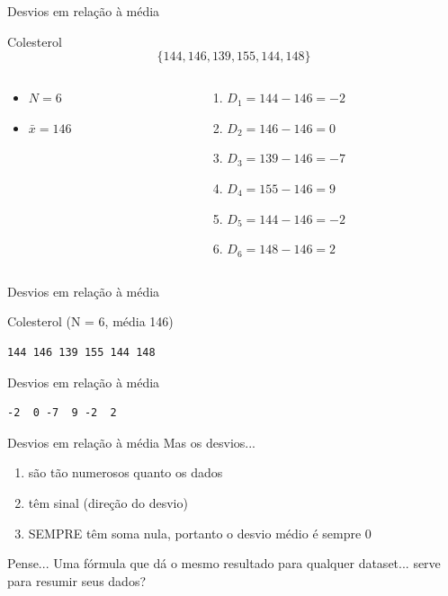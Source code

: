 \documentclass{beamer}
\begin{document}
\begin{frame}{\scriptsize Desvios em relação à média}
\begin{exampleblock}{Colesterol}
    \scriptsize
  \begin{displaymath}
    \{144, 146, 139, 155, 144, 148\}
  \end{displaymath}
  \bigskip
  \begin{columns}
    \begin{column}{5cm}
  \begin{itemize}
    \scriptsize
  \item $N=6$
  \item $\bar{x} = 146$
  \end{itemize}
\end{column}
\begin{column}{5cm}
  \begin{enumerate}
    \tiny
  \item $D_1 = 144 - 146 = -2$
  \item $D_2 = 146 - 146 = 0$
  \item $D_3 = 139 - 146 = -7$
  \item $D_4 = 155 - 146 = 9$
  \item $D_5 = 144 - 146 = -2$
  \item $D_6 = 148 - 146 = 2$
  \end{enumerate}
\end{column}
\end{columns}
\end{exampleblock}
\end{frame}

\begin{frame}[fragile]{\scriptsize Desvios em relação à média}
  \begin{block}{Colesterol (N = 6, média 146)}
    \footnotesize
\begin{verbatim}
144 146 139 155 144 148
\end{verbatim}
  \end{block}
  \begin{block}{Desvios em relação à média}
    \footnotesize
\begin{verbatim}
-2  0 -7  9 -2  2
\end{verbatim}
  \end{block}
\end{frame}

\begin{frame}{\scriptsize Desvios em relação à média}
  \footnotesize
  Mas os desvios...
  \bigskip
  \begin{enumerate}
    \footnotesize
  \item são tão numerosos quanto os dados
    \bigskip
  \item têm sinal (direção do desvio)
    \bigskip
  \item SEMPRE têm soma \alert{nula}, portanto o desvio médio é sempre 0
  \end{enumerate}
  \bigskip
  \vfill
  \begin{block}{Pense...}
    \footnotesize
    Uma fórmula que dá o mesmo resultado para qualquer dataset... serve para resumir seus dados?
  \end{block}
\end{frame}
\end{document}
